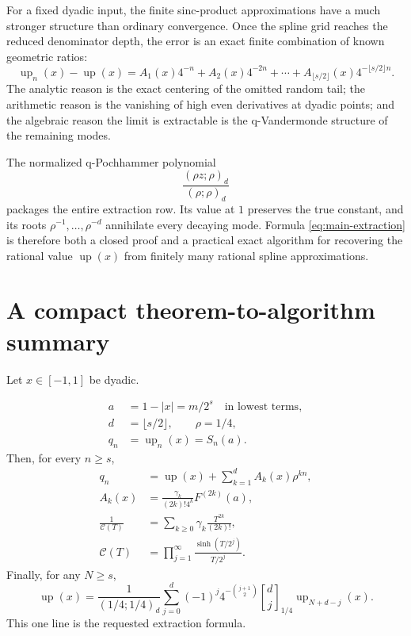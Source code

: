 \documentclass[11pt]{article}
\newcommand{\upf}{\operatorname{up}}
\newcommand{\qbinom}[3]{\genfrac{[}{]}{0pt}{}{#1}{#2}_{#3}}
\newcommand{\poch}[3]{\left(#1;#2\right)_{#3}}
\begin{document}
For a fixed dyadic input, the finite sinc-product approximations have a much
stronger structure than ordinary convergence.  Once the spline grid reaches
the reduced denominator depth, the error is an exact finite combination of
known geometric ratios:
\begin{equation}
 \upf_n(x)-\upf(x)
 =A_1(x)4^{-n}+A_2(x)4^{-2n}+\cdots
 +A_{\lfloor s/2\rfloor}(x)4^{-\lfloor s/2\rfloor n}.
\end{equation}
The analytic reason is the exact centering of the omitted random tail; the
arithmetic reason is the vanishing of high even derivatives at dyadic points;
and the algebraic reason the limit is extractable is the q-Vandermonde
structure of the remaining modes.

The normalized q-Pochhammer polynomial
\begin{equation}
 \frac{\poch{\rho z}{\rho}{d}}{\poch{\rho}{\rho}{d}}
\end{equation}
packages the entire extraction row.  Its value at $1$ preserves the true
constant, and its roots $\rho^{-1},\ldots,\rho^{-d}$ annihilate every decaying
mode.  Formula \eqref{eq:main-extraction} is therefore both a closed proof and
a practical exact algorithm for recovering the rational value $\upf(x)$ from
finitely many rational spline approximations.

\appendix

\section{A compact theorem-to-algorithm summary}

Let $x\in[-1,1]$ be dyadic.

\begin{align*}
 a&=1-|x|=m/2^s\quad\text{in lowest terms},\\
 d&=\lfloor s/2\rfloor,\qquad \rho=1/4,\\
 q_n&=\upf_n(x)=S_n(a).
\end{align*}
Then, for every $n\ge s$,
\begin{align*}
 q_n
 &=\upf(x)+\sum_{k=1}^{d}A_k(x)\rho^{kn},\\
 A_k(x)
 &=\frac{\gamma_k}{(2k)!4^k}F^{(2k)}(a),\\
 \frac1{\mathscr C(T)}
 &=\sum_{k\ge0}\gamma_k\frac{T^{2k}}{(2k)!},\\
 \mathscr C(T)
 &=\prod_{j=1}^{\infty}\frac{\sinh(T/2^j)}{T/2^j}.
\end{align*}
Finally, for any $N\ge s$,
\begin{equation*}
 \upf(x)=\frac{1}{\poch{1/4}{1/4}{d}}
 \sum_{j=0}^{d}(-1)^j4^{-\binom{j+1}{2}}
 \qbinom{d}{j}{1/4}\upf_{N+d-j}(x).
\end{equation*}
This one line is the requested extraction formula.
\end{document}
